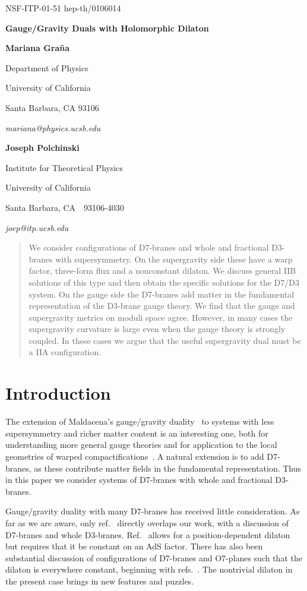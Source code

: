 \documentclass[a4paper,12pt]{article}
\renewcommand{\=}[1]{\bar{#1}}
\providecommand{\sect}[1]{\section{#1}\setcounter{equation}{0}}
\begin{document}
\bigskip
\hskip 5in\vbox{\baselineskip12pt
\hbox{NSF-ITP-01-51}
\hbox{hep-th/0106014}}
\bigskip\bigskip

\centerline{\Large \bf Gauge/Gravity Duals with Holomorphic Dilaton
}
\bigskip
\centerline{\bf Mariana Gra\~na}
\medskip
\centerline{Department of Physics}
\centerline{University of California}
\centerline{Santa Barbara, CA 93106}
\centerline{\it mariana@physics.ucsb.edu}
\bigskip
\centerline{\bf Joseph Polchinski}
\medskip
\centerline{Institute for Theoretical Physics}
\centerline{University of California}
\centerline{Santa Barbara, CA\ \ 93106-4030}
\centerline{\it joep@itp.ucsb.edu}


\begin{abstract}

We consider configurations of D7-branes and whole and fractional D3-branes
with \coordHE{} supersymmetry.
On the supergravity side these have a warp factor, three-form flux and a
nonconstant dilaton. We discuss general IIB solutions of this type
and then obtain the specific solutions for the D7/D3 system.  On the gauge side the
D7-branes add matter in the fundamental representation of the D3-brane gauge
theory. We find that the gauge and supergravity metrics on moduli space agree. 
However, in many cases the supergravity curvature is large even when
the gauge theory is strongly coupled.  In these cases we argue that the useful
supergravity dual must be a IIA configuration. 




\end{abstract}

\newpage
\baselineskip=17pt

\sect{Introduction}

The extension of Maldacena's gauge/gravity duality~\cite{maldacena} to systems
with less supersymmetry and richer matter content is an interesting one, both for
understanding more general gauge theories and for application to the local
geometries of warped compactifications~\cite{us}.  A natural extension is to add
D7-branes, as these contribute matter fields in the fundamental representation. 
Thus in this paper we consider \coordHE{} systems of D7-branes with whole and
fractional D3-branes.

Gauge/gravity duality with many D7-branes has received little consideration.
As far as we are aware, only ref.~\cite{Aharonyetal} directly overlaps our
work, with a discussion of D7-branes and
whole D3-branes.  Ref.~\cite{kehag} allows for a position-dependent dilaton
but requires that it be constant on an AdS\coordHE{} factor.  There has also been
substantial discussion of configurations of D7-branes and O7-planes such that
the dilaton is everywhere constant, beginning with
refs.~\cite{condil,Aharonyetal}.  The nontrivial dilaton in the present case
brings in new features and puzzles.
\end{document}
